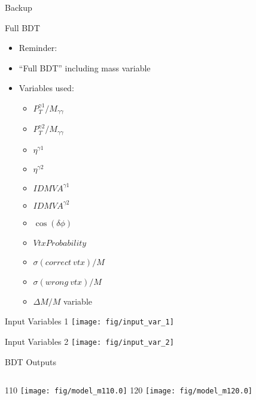 \documentclass[t, 8pt]{beamer}
\begin{document}

\begin{frame}{Backup}
\end{frame}

\begin{frame}{Full BDT}
  \begin{itemize}  
  \item Reminder:
  \item ``Full BDT'' including mass variable
  \item Variables used:
  \begin{itemize}  
    \item $P_T^{\gamma 1} / M_{\gamma \gamma}$
    \item $P_T^{\gamma 2} / M_{\gamma \gamma}$
    \item $\eta^{\gamma 1}$
    \item $\eta^{\gamma 2}$
    \item $ID MVA^{\gamma 1}$
    \item $ID MVA^{\gamma 2}$
    \item $\cos( \delta \phi )$
    \item $Vtx Probability$
    \item $\sigma(correct ~vtx)/M$
    \item $\sigma(wrong ~vtx)/M$
    \item \alert{$\Delta M/M$ variable}
  \end{itemize}
  \end{itemize}
\end{frame}

\begin{frame}{Input Variables 1}
    \texttt{[image: fig/input\_var\_1]}
\end{frame}

\begin{frame}{Input Variables 2}
    \texttt{[image: fig/input\_var\_2]}
\end{frame}


\begin{frame}{BDT Outputs}
  \vspace{1cm}
  \begin{columns}[c]
    110
    \texttt{[image: fig/model\_m110.0]}
    120
    \texttt{[image: fig/model\_m120.0]}
  \end{columns}
\end{frame}
\end{document}
